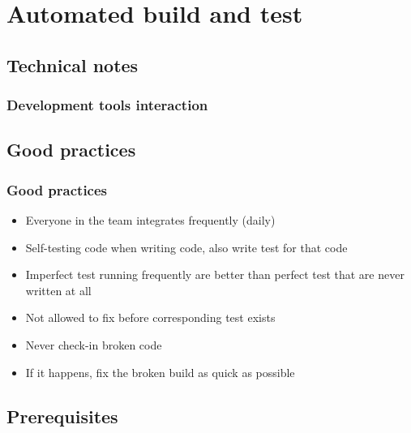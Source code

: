 \documentclass[handout]{beamer}
\begin{document}
\section[Automated build and test]{Automated build and test}
\subsection[Technical notes]{Technical notes}

\begin{frame}
\frametitle{Development tools interaction}
\centering
{}
\end{frame}

\subsection[Good practices]{Good practices}
\begin{frame}
\frametitle{Good practices}
\begin{itemize}
  \item<1-> Everyone in the team integrates frequently (daily)\cite{Fowler06}
  \item<2-> Self-testing code when writing code, also write test for
  that code\cite{Duvall07}
  \item<3-> Imperfect test running frequently are better than perfect test that
  are never written at all\cite{Duvall07}
  \item<4-> Not allowed to fix before corresponding test exists
  \item<5-> Never check-in broken code\cite{Berczuk03} 
  \item<6-> If it happens, fix the broken build as quick as possible 
\end{itemize}
\end{frame}


\subsection[Prerequisites]{Prerequisites}
\end{document}
